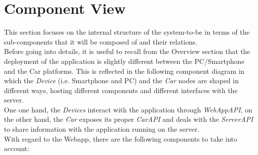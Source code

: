\documentclass[11pt,a4paper]{report}
\begin{document}
\section{Component View}
This section focuses on the internal structure of the system-to-be in terms of the sub-components that it will be composed of and their relations.\\Before going into details, it is useful to recall from the Overview section that the deployment of the application is slightly different between the PC/Smartphone and the Car platforms. This is reflected in the following component diagram in which the \textit{Device} (i.e. Smartphone and PC) and the \textit{Car} nodes are shaped in different ways, hosting different components and different interfaces with the server.\\One one hand, the \textit{Devices} interact with the application through \textit{WebAppAPI}, on the other hand, the \textit{Car} exposes its proper \textit{CarAPI} and deals with the \textit{ServerAPI} to share information with the application running on the server.\\With regard to the Webapp, there are the following components to take into account:
\end{document}
